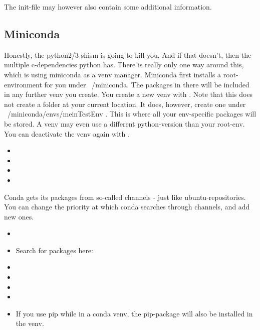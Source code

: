 The init-file may however also contain some additional information. 


\subsection{Miniconda}
Honestly, the python2/3 shism is going to kill you. And if that doesn't, then the multiple c-dependencies python has. There is really only one way around this, which is using miniconda as a venv manager.
Miniconda first installs a root-environment for you under ~/miniconda. The packages in there will be included in any further venv you create. 
You create a new venv with . Note that this does not create a folder at your current location. It does, however, create one under ~/miniconda/envs/meinTestEnv . This is where all your env-specific packages will be stored. A venv may even use a different python-version than your root-env.
You can deactivate the venv again with .

\begin{itemize}
    \item {}
    \item {}
    \item {}
    \item {}
\end{itemize}

Conda gets its packages from so-called channels - just like ubuntu-repositories. You can change the priority at which conda searches through channels, and add new ones. 

\begin{itemize}
    \item {}
    \item Search for packages here: 
    \item {}
    \item {}
    \item {}
    \item {}
    \item If you use pip while in a conda venv, the pip-package will also be installed in the venv. 
\end{itemize}